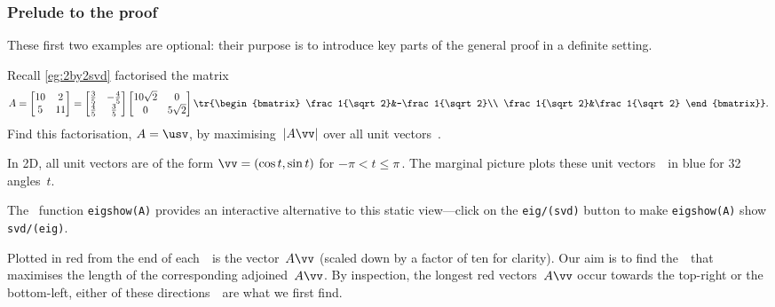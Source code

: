 \subsubsection{Prelude to the proof}

These first two examples are optional: their purpose is to introduce key parts of the general proof in a definite setting.

\begin{example} \label{eg:2by2svdx}
Recall \autoref{eg:2by2svd} factorised the matrix
\begin{equation*}
A=\begin{bmatrix} 10&2\\5&11 \end{bmatrix}=
\begin{bmatrix} \frac35&-\frac45\\\frac45&\frac35 \end{bmatrix}
\begin{bmatrix} 10\sqrt2&0\\0&5\sqrt2 \end{bmatrix}
\tr{\begin{bmatrix} \frac1{\sqrt2}&-\frac1{\sqrt2}\\ \frac1{\sqrt2}&\frac1{\sqrt2} \end{bmatrix}}.
\end{equation*}
Find this factorisation, \(A=\usv\), by maximising~\(|A\vv|\) over all unit vectors~\vv.


\begin{solution} 
In 2D, all unit vectors are of the form \(\vv=(\cos t,\sin t)\) for \(-\pi<t\leq\pi\)\,.  
The marginal picture plots these unit vectors~\vv\ in blue for 32 angles~\(t\).
%
\begin{aside}
The \script[1]\ function \texttt{eigshow(A)} provides an interactive alternative to this static view---click on the \texttt{eig/(svd)} button to make \texttt{eigshow(A)} show \texttt{svd/(eig)}.
\end{aside}%
Plotted in red from the end of each~\vv\ is the vector~\(A\vv\) (scaled down by a factor of ten for clarity).
Our aim is to find the~\vv\ that maximises the length of the corresponding adjoined~\(A\vv\).
By inspection, the longest red vectors~\(A\vv\) occur towards the top-right or the bottom-left, either of these directions~\vv\ are what we first find.


\end{solution}
\end{example}
